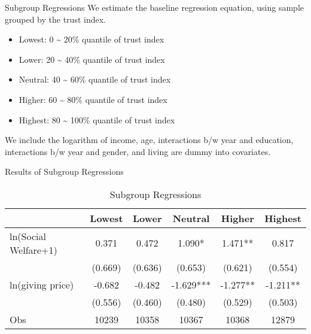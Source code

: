 \documentclass[
  ignorenonframetext,
]{beamer}
\providecommand{\tightlist}{%
  \setlength{\itemsep}{0pt}\setlength{\parskip}{0pt}}
\begin{document}
\begin{frame}{Subgroup Regressions}
\protect\hypertarget{subgroup-regressions}{}
We estimate the baseline regression equation, using sample grouped by
the trust index.

\begin{itemize}
\tightlist
\item
  Lowest: 0 \textasciitilde{} 20\% quantile of trust index
\item
  Lower: 20 \textasciitilde{} 40\% quantile of trust index
\item
  Neutral: 40 \textasciitilde{} 60\% quantile of trust index
\item
  Higher: 60 \textasciitilde{} 80\% quantile of trust index
\item
  Highest: 80 \textasciitilde{} 100\% quantile of trust index
\end{itemize}

We include the logarithm of income, age, interactions b/w year and
education, interactions b/w year and gender, and living are dummy into
covariates.
\end{frame}

\begin{frame}{Results of Subgroup Regressions}
\protect\hypertarget{results-of-subgroup-regressions}{}
\begin{table}

\caption{\label{tab:kableTabTrustGroupReg}Subgroup Regressions}
\centering
\fontsize{9}{11}\selectfont
\begin{tabular}[t]{lccccc}
\toprule
 & Lowest & Lower & Neutral & Higher & Highest\\
\midrule
ln(Social Welfare+1) & 0.371 & 0.472 & 1.090* & 1.471** & 0.817\\
 & (0.669) & (0.636) & (0.653) & (0.621) & (0.554)\\
ln(giving price) & -0.682 & -0.482 & -1.629*** & -1.277** & -1.211**\\
 & (0.556) & (0.460) & (0.480) & (0.529) & (0.503)\\
Obs & 10239 & 10358 & 10367 & 10368 & 12879\\
\bottomrule
\end{tabular}
\end{table}
\end{frame}
\end{document}
